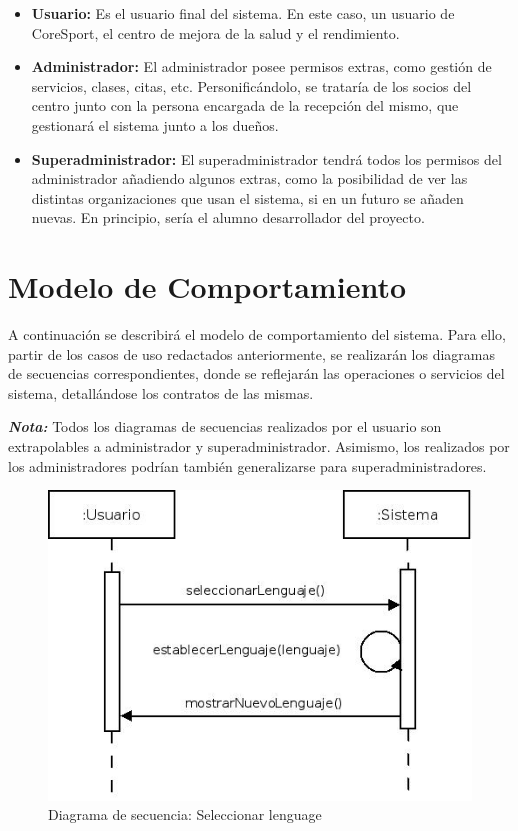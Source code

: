 \begin{itemize}
\item \textbf{Usuario:} Es el usuario final del sistema. En este caso, un usuario de CoreSport, el centro de mejora de la salud y el rendimiento.
\item \textbf{Administrador:} El administrador posee permisos extras, como gestión de servicios, clases, citas, etc. Personificándolo, se trataría de los socios del centro junto con la persona encargada de la recepción del mismo, que gestionará el sistema junto a los dueños.
\item \textbf{Superadministrador:} El superadministrador tendrá todos los permisos del administrador añadiendo algunos extras, como la posibilidad de ver las distintas organizaciones que usan el sistema, si en un futuro se añaden nuevas. En principio, sería el alumno desarrollador del proyecto.
\end {itemize}



\section{Modelo de Comportamiento}
A continuación se describirá el modelo de comportamiento del sistema. Para ello, partir de los casos de uso redactados anteriormente, se realizarán los diagramas de secuencias correspondientes, donde se reflejarán las operaciones o servicios del sistema, detallándose los contratos de las mismas.

\textbf{\textit{Nota:}} Todos los diagramas de secuencias realizados por el usuario son extrapolables a administrador y superadministrador. Asimismo, los realizados por los administradores podrían también generalizarse para superadministradores. 


\vspace{10mm} %

\begin{figure}[H]
\centering
  \includegraphics[scale=.55]{img/secuencias/seleccionar-idioma.jpeg}
  \caption{Diagrama de secuencia: Seleccionar lenguage}
  \label{fig:secuencia-seleccionar-lenguaje}
\end{figure}


